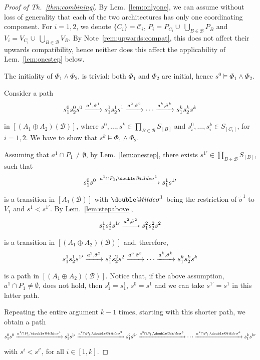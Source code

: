 \documentclass{llncs}
\makeatletter
\newcommand{\rem}[1]{Note~\ref{rem:#1}}
\newcommand{\lem}[1]{Lem.~\ref{lem:#1}}
\newcommand{\thm}[1]{Th.~\ref{thm:#1}}
\newcommand{\cB}{\ensuremath{\mathcal{B}}}
\newcommand{\cC}{\ensuremath{\mathcal{C}}}
\newcommand{\goesto}[2][]{\ensuremath{\xrightarrow[{#1}\relax]{#2}}}
\newcommand{\order}{<}
\newcommand{\val}[3][]{\ensuremath{#1{\sigma}^{#2}_{#3}}}
\newcommand{\semopen}[1]{\ensuremath{[{#1}]}}
\newcommand{\arcomp}{\oplus}
\newcommand{\doubletilde}[1]{{%
  \mathpalette\double@tilde{#1}%
}}
\newcommand{\double@tilde}[2]{%
  \sbox\z@{$\m@th#1\tilde{#2}$}%
  \ht\z@=.9\ht\z@
  \tilde{\box\z@}%
}
\makeatother
\begin{document}
\begin{proof}[Proof of \thm{combining}]
  By \lem{onlyone}, we can assume without loss of generality that each of the two
  architectures has only one coordinating component.  For $i =
  1,2$, we denote $\{C_i\} = \cC_i$, $P_i = P_{C_i}
  \cup\ \bigcup_{B \in \cB} P_B$ and $V_i = V_{C_i}
  \cup\ \bigcup_{B \in \cB} V_B$.
%
  By \rem{upwards:compat}, this does not affect their upwards
  compatibility, hence neither does this affect the applicability of
  \lem{onestep} below.
  
  The initiality of $\Phi_1 \land \Phi_2$, is trivial: both
  $\Phi_1$ and $\Phi_2$ are initial, hence $s^0 \models \Phi_1
  \land \Phi_2$.

  Consider a path
%
  \[
  s^0_1 s^0_2 s^0
%
  \goesto{a^1, \val[\tilde]{1}{}}
%
  s^1_1 s^1_2 s^1
%
  \goesto{a^2, \val[\tilde]{2}{}}
  \cdots
  \goesto{a^k, \val[\tilde]{k}{}}
%
  s^k_1 s^k_2 s^k
  \]
%
  in $\semopen{(A_1 \arcomp A_2)(\cB)}$, where
  $s^0,\dots,s^k \in \prod_{B \in \cB} S_{\semopen{B}}$ and
  $s^0_i,\dots, s^k_i \in S_{\semopen{C_i}}$, for $i=1,2$.
  We have to show that $s^k \models \Phi_1 \land \Phi_2$.

  Assuming that $a^1 \cap P_1 \neq \emptyset$, by \lem{onestep},
  there exists $s^{1\prime} \in \prod_{B \in \cB} S_{\semopen{B}}$,
  such that
%
  \[
  s^0_1 s^0
%
  \goesto{a^1 \cap P_1, \val[\doubletilde]{1}{}}
%
  s^1_1 s^{1\prime}
  \]
%
  is a transition in $\semopen{A_1(\cB)}$ with
  $\val[\doubletilde]{1}{}$ being the restriction of
  $\val[\tilde]{1}{}$ to $V_1$ and
  $s^1 \order s^{1\prime}$.
%
  By \lem{stepabove}, 
  \[
  s^1_1 s^1_2 s^{1\prime}
%
  \goesto{a^2, \val[\tilde]{2}{}}
%
  s^2_1 s^2_2 s^2
  \]
  is a transition in $\semopen{(A_1 \arcomp A_2)(\cB)}$ and,
  therefore, 
  \[
  s^1_1 s^1_2 s^{1\prime}
%
  \goesto{a^2, \val[\tilde]{2}{}}
%
  s^2_1 s^2_2 s^2
%
  \goesto{a^3, \val[\tilde]{3}{}}
  \cdots
  \goesto{a^k, \val[\tilde]{k}{}}
%
  s^k_1 s^k_2 s^k
  \]
%  
  is a path in $\semopen{(A_1 \arcomp A_2)(\cB)}$.
%
  Notice that, if the above assumption, $a^1 \cap P_1 \neq
  \emptyset$, does not hold, then $s^0_1 = s^1_1$, $s^0 = s^1$
  and we can take $s^{1\prime} = s^1$ in this latter path.

  Repeating the entire argument $k-1$ times, starting with this
  shorter path, we obtain a path
%
  \begin{equation}
    \label{eq:path-in-1}
    s^0_1 s^0
    \goesto{a^1 \cap P_1, \val[\doubletilde]{1}{}}
    s^1_1 s^{1\prime}
    \goesto{a^2 \cap P_1, \val[\doubletilde]{2}{}}
    s^2_1 s^{2\prime}
    \goesto{a^3 \cap P_1, \val[\doubletilde]{3}{}}
    \cdots
    \goesto{a^k \cap P_1, \val[\doubletilde]{k}{}}
    s^k_1 s^{k\prime}
  \end{equation}
%  
  with $s^i \order s^{i\prime}$, for all $i \in [1,k]$.


\end{proof}
\end{document}
